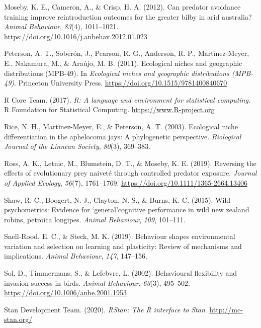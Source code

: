 \documentclass[
]{article}
\newlength{\cslhangindent}
\newenvironment{CSLReferences}[2] %
 {\begin{list}{}{%
  \setlength{\itemindent}{0pt}
  \setlength{\leftmargin}{0pt}
  \setlength{\parsep}{0pt}
  \ifodd #1
   \setlength{\leftmargin}{\cslhangindent}
   \setlength{\itemindent}{-1\cslhangindent}
  \fi
  \setlength{\itemsep}{#2\baselineskip}}}
 {\end{list}}
\begin{document}
\begin{CSLReferences}{1}{0}
Moseby, K. E., Cameron, A., \& Crisp, H. A. (2012). Can predator
avoidance training improve reintroduction outcomes for the greater bilby
in arid australia? \emph{Animal Behaviour}, \emph{83}(4), 1011--1021.
\url{https://doi.org/10.1016/j.anbehav.2012.01.023}

Peterson, A. T., Soberón, J., Pearson, R. G., Anderson, R. P.,
Martı́nez-Meyer, E., Nakamura, M., \& Araújo, M. B. (2011). Ecological
niches and geographic distributions (MPB-49). In \emph{Ecological niches
and geographic distributions (MPB-49)}. Princeton University Press.
\url{https://doi.org/10.1515/9781400840670}

R Core Team. (2017). \emph{R: A language and environment for statistical
computing}. R Foundation for Statistical Computing.
\url{https://www.R-project.org}

Rice, N. H., Martinez-Meyer, E., \& Peterson, A. T. (2003). Ecological
niche differentiation in the aphelocoma jays: A phylogenetic
perspective. \emph{Biological Journal of the Linnean Society},
\emph{80}(3), 369--383.

Ross, A. K., Letnic, M., Blumstein, D. T., \& Moseby, K. E. (2019).
Reversing the effects of evolutionary prey naivet{é} through controlled
predator exposure. \emph{Journal of Applied Ecology}, \emph{56}(7),
1761--1769. \url{https://doi.org/10.1111/1365-2664.13406}

Shaw, R. C., Boogert, N. J., Clayton, N. S., \& Burns, K. C. (2015).
Wild psychometrics: Evidence for `general'cognitive performance in wild
new zealand robins, petroica longipes. \emph{Animal Behaviour},
\emph{109}, 101--111.

Snell-Rood, E. C., \& Steck, M. K. (2019). Behaviour shapes
environmental variation and selection on learning and plasticity: Review
of mechanisms and implications. \emph{Animal Behaviour}, \emph{147},
147--156.

Sol, D., Timmermans, S., \& Lefebvre, L. (2002). Behavioural flexibility
and invasion success in birds. \emph{Animal Behaviour}, \emph{63}(3),
495--502. \url{https://doi.org/10.1006/anbe.2001.1953}

Stan Development Team. (2020). \emph{{RStan}: The {R} interface to
{Stan}}. \url{http://mc-stan.org/}


\end{CSLReferences}
\end{document}
